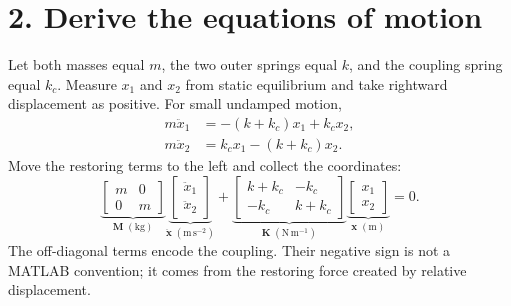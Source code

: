 \documentclass[11pt,a4paper]{article}
\begin{document}
\section*{2. Derive the equations of motion}
Let both masses equal $m$, the two outer springs equal $k$, and the coupling spring equal $k_c$. Measure $x_1$ and $x_2$ from static equilibrium and take rightward displacement as positive. For small undamped motion,
\begin{align}
 m\ddot{x}_1 &= -(k+k_c)x_1+k_cx_2,\\
 m\ddot{x}_2 &= k_cx_1-(k+k_c)x_2.
\end{align}
Move the restoring terms to the left and collect the coordinates:
\begin{equation}
 \underbrace{\begin{bmatrix}m&0\\0&m\end{bmatrix}}_{\mathbf{M}\;(\mathrm{kg})}
 \underbrace{\begin{bmatrix}\ddot{x}_1\\\ddot{x}_2\end{bmatrix}}_{\ddot{\mathbf{x}}\;(\mathrm{m\,s^{-2}})}+
 \underbrace{\begin{bmatrix}k+k_c&-k_c\\-k_c&k+k_c\end{bmatrix}}_{\mathbf{K}\;(\mathrm{N\,m^{-1}})}
 \underbrace{\begin{bmatrix}x_1\\x_2\end{bmatrix}}_{\mathbf{x}\;(\mathrm{m})}=0.
\end{equation}
The off-diagonal terms encode the coupling. Their negative sign is not a MATLAB convention; it comes from the restoring force created by relative displacement.
\end{document}

